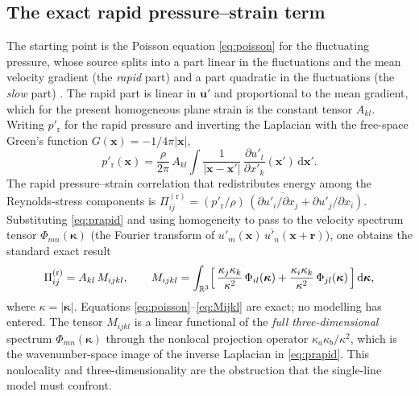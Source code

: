 \documentclass[11pt,a4paper]{article}
\begin{document}
\subsection{The exact rapid pressure--strain term}\label{sec:exact-pi}

The starting point is the Poisson equation \eqref{eq:poisson} for the
fluctuating pressure, whose source splits into a part linear in the
fluctuations and the mean velocity gradient (the \emph{rapid} part) and a
part quadratic in the fluctuations (the \emph{slow} part)
\citep{Pope2000}. The rapid part is linear in $\boldsymbol{u}'$ and
proportional to the mean gradient, which for the present homogeneous
plane strain is the constant tensor $A_{kl}$. Writing
$p'_{\mathrm r}$ for the rapid pressure and inverting the Laplacian with the
free-space Green's function $G(\boldsymbol{x})=-1/4\pi|\boldsymbol{x}|$,
\begin{equation}
  p'_{\mathrm r}(\boldsymbol{x})
  = \frac{\rho}{2\pi}\,A_{kl}\!\int
    \frac{1}{|\boldsymbol{x}-\boldsymbol{x}'|}\,
    \frac{\partial u'_l}{\partial x'_k}(\boldsymbol{x}')\,
    \mathrm{d}\boldsymbol{x}' .
  \label{eq:prapid}
\end{equation}
The rapid pressure--strain correlation that redistributes energy among the
Reynolds-stress components is
$\Pi^{(\mathrm r)}_{ij}
   = \overline{(p'_{\mathrm r}/\rho)\,(\partial u'_i/\partial x_j
     + \partial u'_j/\partial x_i)}$.
Substituting \eqref{eq:prapid} and using homogeneity to pass to the
velocity spectrum tensor
$\Phi_{mn}(\boldsymbol{\kappa})$
(the Fourier transform of $\overline{u'_m(\boldsymbol{x})\,
u'_n(\boldsymbol{x}+\boldsymbol{r})}$),
one obtains the standard exact result
\citep{BatchelorProudman1954,Crow1968,HuntCarruthers1990}
\begin{equation}
  \Pi^{(\mathrm r)}_{ij}
  = A_{kl}\,M_{ijkl},
  \qquad
  M_{ijkl}
  = \int_{\mathbb{R}^3}
    \Bigl[\,
      \frac{\kappa_j\kappa_k}{\kappa^2}\,\Phi_{il}(\boldsymbol{\kappa})
      + \frac{\kappa_i\kappa_k}{\kappa^2}\,\Phi_{jl}(\boldsymbol{\kappa})
    \,\Bigr]\,\mathrm{d}\boldsymbol{\kappa},
  \label{eq:Mijkl}
\end{equation}
where $\kappa=|\boldsymbol{\kappa}|$. Equations
\eqref{eq:poisson}--\eqref{eq:Mijkl} are exact; no modelling has entered. The
tensor $M_{ijkl}$ is a linear functional of the \emph{full three-dimensional}
spectrum $\Phi_{mn}(\boldsymbol{\kappa})$ through the nonlocal projection
operator $\kappa_a\kappa_b/\kappa^2$, which is the wavenumber-space image of
the inverse Laplacian in \eqref{eq:prapid}. This nonlocality and
three-dimensionality are the obstruction that the single-line model must
confront.
\end{document}
